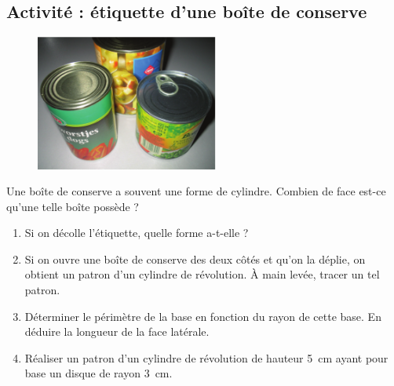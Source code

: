 
\subsection*{Activité : étiquette d'une boîte de conserve}

\begin{figure}
\includegraphics[width=6cm]{conserve.pdf} 
\end{figure}


Une boîte de conserve a souvent une forme de cylindre. Combien de face est-ce qu'une telle boîte possède ?

\begin{enumerate}
    \item
        Si on décolle l'étiquette, quelle forme a-t-elle ?
    \item

 Si on ouvre une boîte de conserve des deux côtés et qu'on la déplie, on obtient un patron d'un cylindre de révolution. À main levée, tracer un tel patron.
 \item
    Déterminer le périmètre de la base en fonction du rayon de cette base. En déduire la longueur de la face latérale. 
\item

    Réaliser un patron d'un cylindre de révolution de hauteur \SI{5}{\centi\meter} ayant pour base un disque de rayon \SI{3}{\centi\meter}. 

\end{enumerate}
